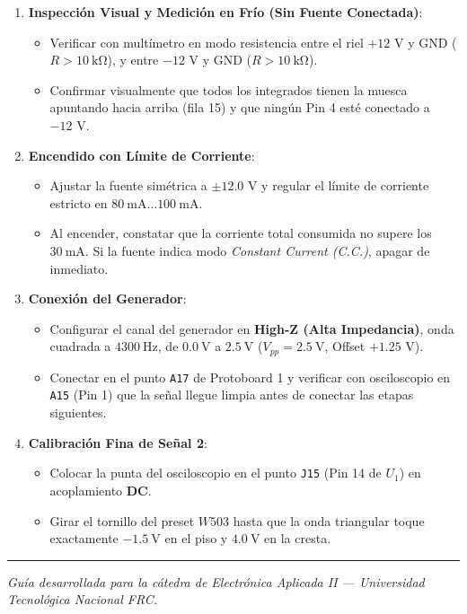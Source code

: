 \documentclass[10pt, a4paper]{article}
\begin{document}
\begin{notabox}
\begin{enumerate}[itemsep=4pt, topsep=2pt]
    \item \textbf{Inspección Visual y Medición en Frío (Sin Fuente Conectada)}:
    \begin{itemize}[itemsep=2pt]
        \item Verificar con multímetro en modo resistencia entre el riel $+12\text{ V}$ y GND ($R > \SI{10}{\kilo\ohm}$), y entre $-12\text{ V}$ y GND ($R > \SI{10}{\kilo\ohm}$).
        \item Confirmar visualmente que todos los integrados tienen la muesca apuntando hacia arriba (fila 15) y que ningún Pin 4 esté conectado a $-12\text{ V}$.
    \end{itemize}
    \item \textbf{Encendido con Límite de Corriente}:
    \begin{itemize}[itemsep=2pt]
        \item Ajustar la fuente simétrica a $\pm 12.0\text{ V}$ y regular el límite de corriente estricto en $\SI{80}{\milli\ampere} \dots \SI{100}{\milli\ampere}$.
        \item Al encender, constatar que la corriente total consumida no supere los $\SI{30}{\milli\ampere}$. Si la fuente indica modo \textit{Constant Current (C.C.)}, apagar de inmediato.
    \end{itemize}
    \item \textbf{Conexión del Generador}:
    \begin{itemize}[itemsep=2pt]
        \item Configurar el canal del generador en \textbf{High-Z (Alta Impedancia)}, onda cuadrada a $\SI{4300}{\hertz}$, de $\SI{0.0}{\volt}$ a $\SI{+2.5}{\volt}$ ($V_{pp} = \SI{2.5}{\volt}$, Offset $+1.25\text{ V}$).
        \item Conectar en el punto \texttt{A17} de Protoboard 1 y verificar con osciloscopio en \texttt{A15} (Pin 1) que la señal llegue limpia antes de conectar las etapas siguientes.
    \end{itemize}
    \item \textbf{Calibración Fina de Señal 2}:
    \begin{itemize}[itemsep=2pt]
        \item Colocar la punta del osciloscopio en el punto \texttt{J15} (Pin 14 de $U_1$) en acoplamiento \textbf{DC}.
        \item Girar el tornillo del preset $W503$ hasta que la onda triangular toque exactamente $\SI{-1.5}{\volt}$ en el piso y $\SI{+4.0}{\volt}$ en la cresta.
    \end{itemize}
\end{enumerate}
\end{notabox}

\vspace{15pt}
\noindent\rule{\textwidth}{0.5pt}
\begin{center}
    \small \color{gray} \textit{Guía desarrollada para la cátedra de Electrónica Aplicada II --- Universidad Tecnológica Nacional FRC.}
\end{center}
\end{document}
